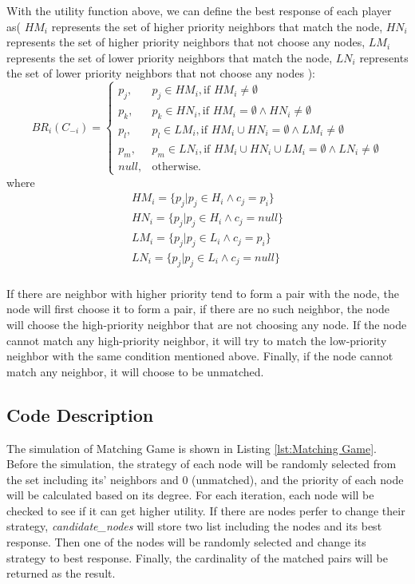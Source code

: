 \documentclass[a4paper, oneside, final, 12pt]{scrartcl} %
\begin{document}
With the utility function above, we can define the best response of each player as(
$HM_i$ represents the set of higher priority neighbors that match the node,
$HN_i$ represents the set of higher priority neighbors that not choose any nodes,
$LM_i$ represents the set of lower priority neighbors that match the node,
$LN_i$ represents the set of lower priority neighbors that not choose any nodes
):
$$ BR_i(C_{-i})=
\begin{cases}
  p_j, & p_j \in HM_i, \text{if } HM_i \ne \emptyset \\
  p_k, & p_k \in HN_i, \text{if } HM_i = \emptyset \land HN_i \ne \emptyset \\
  p_l, & p_l \in LM_i, \text{if } HM_i \cup HN_i = \emptyset \land LM_i \ne \emptyset \\
  p_m, & p_m \in LN_i, \text{if } HM_i \cup HN_i \cup LM_i = \emptyset \land LN_i \ne \emptyset \\
  null, & \text{otherwise.}
\end{cases}
$$
where
\begin{gather*}
HM_i = \{p_j | p_j \in H_i \land c_j = p_i\} \\
HN_i = \{p_j | p_j \in H_i \land c_j = null\} \\
LM_i = \{p_j | p_j \in L_i \land c_j = p_i\} \\
LN_i = \{p_j | p_j \in L_i \land c_j = null\} \\
\end{gather*}

If there are neighbor with higher priority tend to form a pair with the node,
the node will first choose it to form a pair, 
if there are no such neighbor, 
the node will choose the high-priority neighbor that are not choosing any node.
If the node cannot match any high-priority neighbor,
it will try to match the low-priority neighbor with the same condition mentioned above.
Finally, if the node cannot match any neighbor, it will choose to be unmatched.

\subsection{Code Description}

The simulation of Matching Game is shown in Listing \ref{lst:Matching Game}.
Before the simulation, the strategy of each node will be randomly selected from the set
including its' neighbors and 0 (unmatched),
and the priority of each node will be calculated based on its degree.
For each iteration, each node will be checked to see
if it can get higher utility.
If there are nodes perfer to change their strategy,
\emph{candidate\_nodes} will store two list including the nodes and its best response.
Then one of the nodes will be randomly selected and change its strategy to best response.
Finally, the cardinality of the matched pairs will be returned as the result.
\end{document}
